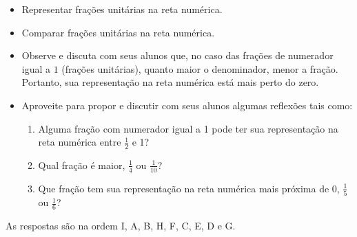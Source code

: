 \begin{atividade}
\begin{center}
\end{center}

\end{atividade}

\begin{atividade}\label{chap3-ativ13}
\objetivos
  \begin{itemize}
   \item Representar frações unitárias na reta numérica.
   \item Comparar frações unitárias na reta numérica.
  \end{itemize}

\discussoes
   \begin{itemize}
   \item  Observe e discuta com seus alunos que, no caso das frações de numerador igual a $1$ (frações unitárias), quanto maior o denominador, menor a fração. Portanto, sua representação na reta numérica está mais perto do zero.
   \item  Aproveite para propor e discutir com seus alunos algumas reflexões tais como:
   \begin{enumerate}[label=\roman*)]
    \item Alguma fração com numerador igual a 1 pode ter sua representação na reta numérica entre $\frac{1}{2}$ e 1?
    \item Qual fração é maior, $\frac{1}{4}$ ou $\frac{1}{10}$?
    \item Que fração tem sua representação na reta numérica mais próxima de 0, $\frac{1}{5}$ ou $\frac{1}{6}$?
   \end{enumerate}

  \end{itemize}

\solucao
As respostas são na ordem I, A, B, H, F, C, E, D e G.

\end{atividade}

